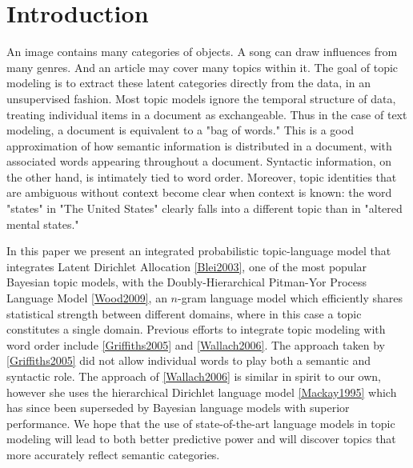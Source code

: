 \section{Introduction}

An image contains many categories of objects.  A song can draw influences from many genres.  And an article may cover many topics within it.  The goal of topic modeling is to extract these latent categories directly from the data, in an unsupervised fashion.  Most topic models ignore the temporal structure of data, treating individual items in a document as exchangeable.  Thus in the case of text modeling, a document is equivalent to a "bag of words."  This is a good approximation of how semantic information is distributed in a document, with associated words appearing throughout a document.  Syntactic information, on the other hand, is intimately tied to word order.  Moreover, topic identities that are ambiguous without context become clear when context is known: the word "states" in "The United States" clearly falls into a different topic than in "altered mental states."  

In this paper we present an integrated probabilistic topic-language model that integrates Latent Dirichlet Allocation \ref{Blei2003}, one of the most popular Bayesian topic models, with the Doubly-Hierarchical Pitman-Yor Process Language Model \ref{Wood2009}, an $n$-gram language model which efficiently shares statistical strength between different domains, where in this case a topic constitutes a single domain.  Previous efforts to integrate topic modeling with word order include \ref{Griffiths2005} and \ref{Wallach2006}.  The approach taken by \ref{Griffiths2005} did not allow individual words to play both a semantic and syntactic role.  The approach of \ref{Wallach2006} is similar in spirit to our own, however she uses the hierarchical Dirichlet language model \ref{Mackay1995} which has since been superseded by Bayesian language models with superior performance.  We hope that the use of state-of-the-art language models in topic modeling will lead to both better predictive power and will discover topics that more accurately reflect semantic categories.
